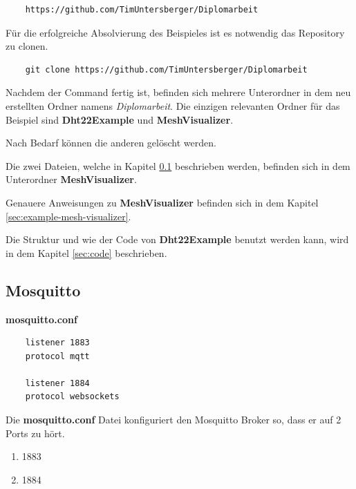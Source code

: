 \vspace*{10px}
\begin{verbatim}
    https://github.com/TimUntersberger/Diplomarbeit
\end{verbatim}
\vspace*{10px}

Für die erfolgreiche Absolvierung des Beispieles ist es notwendig das Repository zu clonen.

\vspace*{10px}
\begin{verbatim}
    git clone https://github.com/TimUntersberger/Diplomarbeit
\end{verbatim}
\vspace*{10px}

Nachdem der Command fertig ist, befinden sich mehrere Unterordner in dem neu erstellten Ordner namens \textit{Diplomarbeit}. Die einzigen relevanten Ordner für das Beispiel sind \textbf{Dht22Example} und \textbf{MeshVisualizer}.

Nach Bedarf können die anderen gelöscht werden.

Die zwei Dateien, welche in Kapitel \ref{sec:mosquitto} beschrieben werden, befinden sich in dem Unterordner \textbf{MeshVisualizer}.

Genauere Anweisungen zu \textbf{MeshVisualizer} befinden sich in dem Kapitel \ref{sec:example-mesh-visualizer}.

Die Struktur und wie der Code von \textbf{Dht22Example} benutzt werden kann, wird in dem Kapitel \ref{sec:code} beschrieben.

\subsection{Mosquitto}\label{sec:mosquitto}

\textbf{mosquitto.conf}
\begin{verbatim}
    listener 1883
    protocol mqtt

    listener 1884
    protocol websockets
\end{verbatim}
\vspace*{10px}

Die \textbf{mosquitto.conf} Datei konfiguriert den Mosquitto Broker so, dass er auf 2 Ports zu hört.

\begin{enumerate}
    \item 1883
    \item 1884
\end{enumerate}

